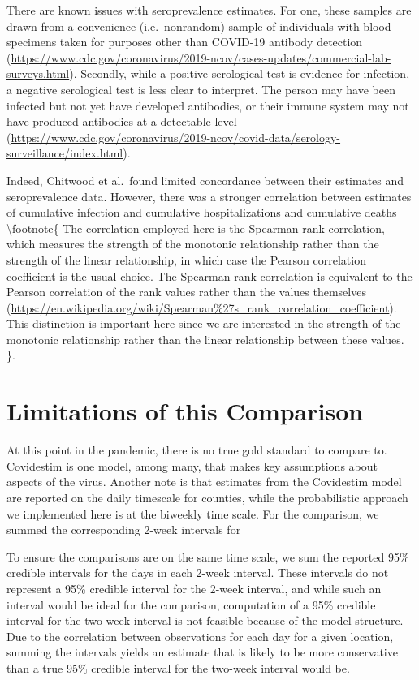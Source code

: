 \documentclass[12pt,twoside]{smiththesis}
\begin{document}
There are known issues with seroprevalence estimates. For one, these samples are drawn from a convenience (i.e.~nonrandom) sample of individuals with blood specimens taken for purposes other than COVID-19 antibody detection (\url{https://www.cdc.gov/coronavirus/2019-ncov/cases-updates/commercial-lab-surveys.html}). Secondly, while a positive serological test is evidence for infection, a negative serological test is less clear to interpret. The person may have been infected but not yet have developed antibodies, or their immune system may not have produced antibodies at a detectable level (\url{https://www.cdc.gov/coronavirus/2019-ncov/covid-data/serology-surveillance/index.html}).

Indeed, Chitwood et al.~found limited concordance between their estimates and seroprevalence data. However, there was a stronger correlation between estimates of cumulative infection and cumulative hospitalizations and cumulative deaths \textbackslash footnote\{ The correlation employed here is the Spearman rank correlation, which measures the strength of the monotonic relationship rather than the strength of the linear relationship, in which case the Pearson correlation coefficient is the usual choice. The Spearman rank correlation is equivalent to the Pearson correlation of the rank values rather than the values themselves (\url{https://en.wikipedia.org/wiki/Spearman\%27s_rank_correlation_coefficient}). This distinction is important here since we are interested in the strength of the monotonic relationship rather than the linear relationship between these values. \}.

\newpage

\hypertarget{limitations-of-this-comparison}{%
\section{Limitations of this Comparison}\label{limitations-of-this-comparison}}

At this point in the pandemic, there is no true gold standard to compare to. Covidestim is one model, among many, that makes key assumptions about aspects of the virus. Another note is that estimates from the Covidestim model are reported on the daily timescale for counties, while the probabilistic approach we implemented here is at the biweekly time scale. For the comparison, we summed the corresponding 2-week intervals for

To ensure the comparisons are on the same time scale, we sum the reported 95\% credible intervals for the days in each 2-week interval. These intervals do not represent a 95\% credible interval for the 2-week interval, and while such an interval would be ideal for the comparison, computation of a 95\% credible interval for the two-week interval is not feasible because of the model structure. Due to the correlation between observations for each day for a given location, summing the intervals yields an estimate that is likely to be more conservative than a true 95\% credible interval for the two-week interval would be.
\end{document}
